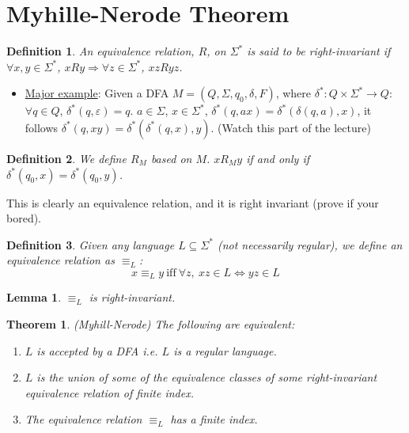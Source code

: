 \documentclass{article}
\newtheorem{theorem}{Theorem}
\newtheorem{definition}{Definition}
\newtheorem{lemma}{Lemma}
\begin{document}
\section{Myhille-Nerode Theorem}
\begin{definition}
An equivalence relation, $R$, on $\Sigma^*$ is said to be right-invariant if $\forall x,y \in \Sigma^*$, $xRy \Rightarrow \forall z \in \Sigma^*$, $xzRyz$.
\end{definition}
\begin{itemize}
    \item \underline{Major example}: Given a DFA $M = (Q,\Sigma, q_0, \delta,F)$, where $\delta^* : Q \times \Sigma^* \rightarrow Q$: $\forall q \in Q$, $\delta^*(q,\varepsilon) = q$. $a \in \Sigma$, $x \in \Sigma^*$, $\delta^*(q,ax) = \delta^*(\delta(q,a),x)$, it follows $\delta^*(q,xy) = \delta^*(\delta^*(q,x),y)$. (Watch this part of the lecture)
\end{itemize}
\begin{definition}
We define $R_M$ based on $M$. $xR_My$ if and only if $\delta^*(q_0,x) = \delta^*(q_0,y)$.
\end{definition}
This is clearly an equivalence relation, and it is right invariant (prove if your bored).
\begin{definition}
Given any language $L \subseteq \Sigma^*$ (not necessarily regular), we define an equivalence relation as $\equiv_L$:
\[x \equiv_L y\ \text{iff}\ \forall z,\ xz \in L \iff yz \in L\]
\end{definition}
\begin{lemma}
$\equiv_L$ is right-invariant.
\end{lemma}
\begin{theorem}
(Myhill-Nerode) The following are equivalent:
\begin{enumerate}
    \item $L$ is accepted by a DFA i.e. $L$ is a regular language.
    \item $L$ is the union of some of the equivalence classes of some right-invariant equivalence relation of finite index.
    \item The equivalence relation $\equiv_L$ has a finite index.
\end{enumerate}
\end{theorem}
\end{document}
